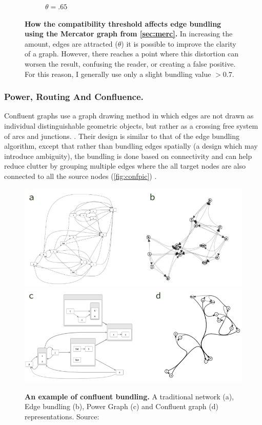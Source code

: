 \begin{figure}[H]
\begin{subfigure}[b]{.49\textwidth}
 \caption{$\theta = .65$}
 \end{subfigure}
        \caption{\textbf{How the compatibility threshold affects edge bundling using the Mercator graph from \autoref{sec:merc}.} In increasing the amount, edges are attracted ($\theta$) it is possible to improve the clarity of a graph. However, there reaches a point where this distortion can worsen the result, confusing the reader, or creating a false positive. For this reason, I generally use only a slight bundling value $> 0.7$.}
      \label{fig:edgebundling}
\end{figure}

\subsubsection{Power, Routing And Confluence.}

Confluent graphs use a graph drawing method in which edges are not drawn as individual distinguishable geometric objects, but rather as a crossing free system of arcs and junctions. \citep{confluient19}. Their design is similar to that of the edge bundling algorithm, except that rather than bundling edges spatially (a design which may introduce ambiguity), the bundling is done based on connectivity and can help reduce clutter by grouping multiple edges where the all target nodes are also connected to all the source nodes (\autoref{fig:confpic}) \citep{confpic}.

\begin{figure}[H]
     \centering
     \includegraphics[width=.75\textwidth]{figures_c1/layout/confluent/example2.png}\\
     \includegraphics[width=.75\textwidth]{figures_c1/layout/confluent/example.png}\\
        \caption{\textbf{An example of confluent bundling. } A traditional network (a), Edge bundling (b), Power Graph (c) and Confluent graph (d) representations. Source: \citep{confpic}}
      \label{fig:confpic}
\end{figure}


